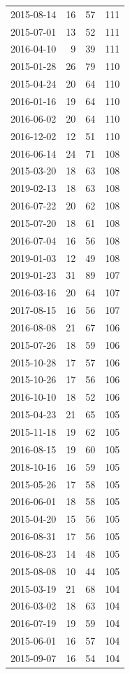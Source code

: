 \begin{tabular}{lrrr}
2015-08-14 & 16 & 57 & 111 \\
2015-07-01 & 13 & 52 & 111 \\
2016-04-10 & 9 & 39 & 111 \\
2015-01-28 & 26 & 79 & 110 \\
2015-04-24 & 20 & 64 & 110 \\
2016-01-16 & 19 & 64 & 110 \\
2016-06-02 & 20 & 64 & 110 \\
2016-12-02 & 12 & 51 & 110 \\
2016-06-14 & 24 & 71 & 108 \\
2015-03-20 & 18 & 63 & 108 \\
2019-02-13 & 18 & 63 & 108 \\
2016-07-22 & 20 & 62 & 108 \\
2015-07-20 & 18 & 61 & 108 \\
2016-07-04 & 16 & 56 & 108 \\
2019-01-03 & 12 & 49 & 108 \\
2019-01-23 & 31 & 89 & 107 \\
2016-03-16 & 20 & 64 & 107 \\
2017-08-15 & 16 & 56 & 107 \\
2016-08-08 & 21 & 67 & 106 \\
2015-07-26 & 18 & 59 & 106 \\
2015-10-28 & 17 & 57 & 106 \\
2015-10-26 & 17 & 56 & 106 \\
2016-10-10 & 18 & 52 & 106 \\
2015-04-23 & 21 & 65 & 105 \\
2015-11-18 & 19 & 62 & 105 \\
2016-08-15 & 19 & 60 & 105 \\
2018-10-16 & 16 & 59 & 105 \\
2015-05-26 & 17 & 58 & 105 \\
2016-06-01 & 18 & 58 & 105 \\
2015-04-20 & 15 & 56 & 105 \\
2016-08-31 & 17 & 56 & 105 \\
2016-08-23 & 14 & 48 & 105 \\
2015-08-08 & 10 & 44 & 105 \\
2015-03-19 & 21 & 68 & 104 \\
2016-03-02 & 18 & 63 & 104 \\
2016-07-19 & 19 & 59 & 104 \\
2015-06-01 & 16 & 57 & 104 \\
2015-09-07 & 16 & 54 & 104 \\

\end{tabular}
